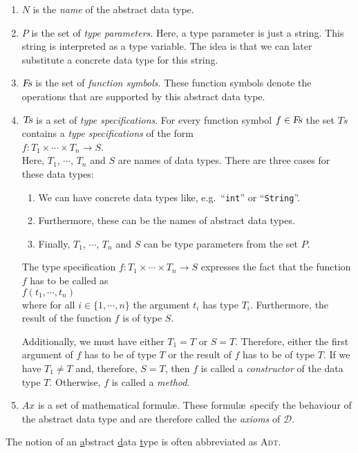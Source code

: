 \begin{enumerate}
\item $N$ is the \emph{name} of the abstract data type.
\item $P$ is the set of \emph{type parameters}.   Here, a type parameter is just a string.
      This string is interpreted as a type variable.  The idea is that we can later substitute 
      a concrete data type for this string.
\item $\textsl{Fs}$ is the set of \emph{function symbols}.  These function symbols denote the 
      operations that are supported by this abstract data type.
\item $\textsl{Ts}$ is a set of \emph{type specifications}.  For every function symbol
      $f \in \textsl{Fs}$
      the set $Ts$ contains a \emph{type specifications} of the form 
      \\[0.2cm]
      \hspace*{1.3cm} 
      $f: T_1 \times \cdots \times T_n \rightarrow S$. 
      \\[0.2cm]
      Here,  $T_1$, $\cdots$, $T_n$ and $S$ are names of data types.  There are three cases for
      these data types: 
      \begin{enumerate}
      \item We can have concrete data types like, e.g.~``\texttt{int}'' or ``\texttt{String}''.
      \item Furthermore, these can be the names of abstract data types.
      \item Finally,  $T_1$, $\cdots$, $T_n$ and $S$ can be type parameters from the set $P$.
      \end{enumerate}
      The type specification $f: T_1 \times \cdots \times T_n \rightarrow S$ expresses the fact that
      the function $f$ has to be called as \\[0.2cm] 
      \hspace*{1.3cm}
      $f(t_1,\cdots,t_n)$ 
      \\[0.2cm]
      where for all $i \in \{1,\cdots,n\}$ the argument $t_i$ has type 
      $T_i$.  Furthermore, the result of the function $f$ is of type $S$.

      Additionally, we must have either $T_1 = T$ or $S = T$.  Therefore, either
      the first argument of $f$ has to be of type $T$ or the result of $f$ has to be of type 
      $T$.  If we have  $T_1 \not= T$ and, therefore, $S = T$,
      then $f$ is called a \emph{constructor} of the data type $T$.  Otherwise,
      $f$ is called a  \emph{method}.
\item $Ax$ is a set of mathematical formul\ae.   These formul\ae\ 
      specify the behaviour of the abstract data type and are therefore called
      the \emph{axioms} of $\mathcal{D}$.
\end{enumerate}
The notion of an \underline{a}bstract \underline{d}ata \underline{t}ype is often abbreviated as \textsc{Adt}.

